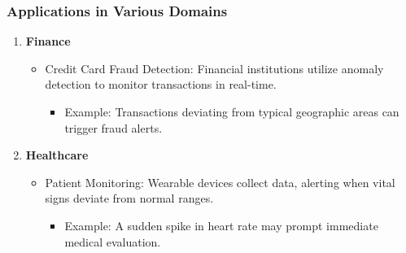 \documentclass{beamer}
\begin{document}
\begin{frame}[fragile]
    \frametitle{Applications in Various Domains}

    \begin{enumerate}
        \item \textbf{Finance}
        \begin{itemize}
            \item Credit Card Fraud Detection: Financial institutions utilize anomaly detection to monitor transactions in real-time.
            \begin{itemize}
                \item Example: Transactions deviating from typical geographic areas can trigger fraud alerts.
            \end{itemize}
        \end{itemize}
        
        \item \textbf{Healthcare}
        \begin{itemize}
            \item Patient Monitoring: Wearable devices collect data, alerting when vital signs deviate from normal ranges.
            \begin{itemize}
                \item Example: A sudden spike in heart rate may prompt immediate medical evaluation.
            \end{itemize}
        \end{itemize}
    \end{enumerate}
\end{frame}
\end{document}
